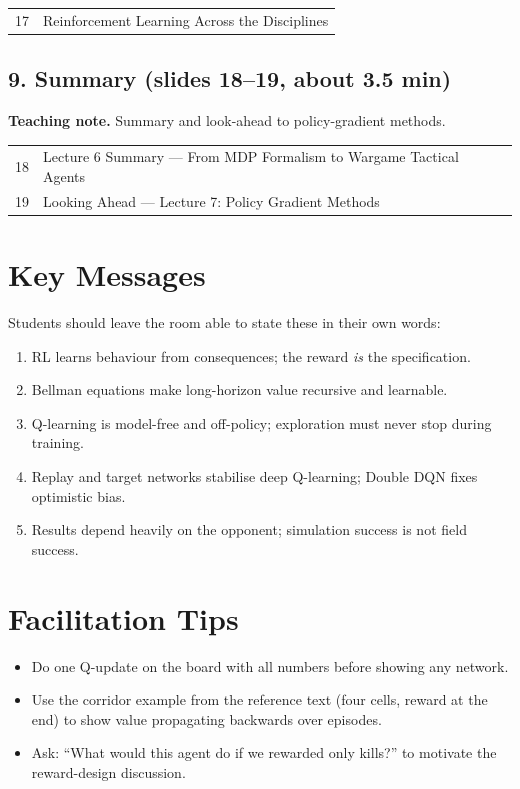 \documentclass[11pt]{article}
\begin{document}
\begin{center}\small\renewcommand{\arraystretch}{1.1}\begin{tabularx}{\textwidth}{@{}r X@{}}17 & Reinforcement Learning Across the Disciplines\\\end{tabularx}\end{center}

\subsection{9. Summary \normalfont\small\color{GreyN}(slides 18--19, about 3.5 min)}

\textbf{Teaching note.} Summary and look-ahead to policy-gradient methods.

\begin{center}\small\renewcommand{\arraystretch}{1.1}\begin{tabularx}{\textwidth}{@{}r X@{}}18 & Lecture 6 Summary --- From MDP Formalism to Wargame Tactical Agents\\
19 & Looking Ahead --- Lecture 7: Policy Gradient Methods\\\end{tabularx}\end{center}

\section{Key Messages}Students should leave the room able to state these in their own words:\begin{keypoint}\begin{enumerate}\item RL learns behaviour from consequences; the reward \emph{is} the specification.\item Bellman equations make long-horizon value recursive and learnable.\item Q-learning is model-free and off-policy; exploration must never stop during training.\item Replay and target networks stabilise deep Q-learning; Double DQN fixes optimistic bias.\item Results depend heavily on the opponent; simulation success is not field success.\end{enumerate}\end{keypoint}

\section{Facilitation Tips}\begin{itemize}\item Do one Q-update on the board with all numbers before showing any network.\item Use the corridor example from the reference text (four cells, reward at the end) to show value propagating backwards over episodes.\item Ask: ``What would this agent do if we rewarded only kills?'' to motivate the reward-design discussion.\end{itemize}
\end{document}
